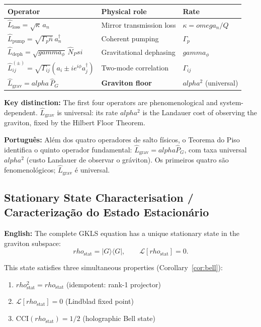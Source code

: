 \documentclass[12pt,a4paper]{article}
\def\Psi{Psi}%
\def\alpha{alpha}%
\def\gamma{gamma}%
\def\rho{rho}%
\def\omega{omega}%
\begin{document}
\begin{center}
\renewcommand{\arraystretch}{1.3}
\begin{tabular}{lll}
\toprule
Operator & Physical role & Rate \\
\midrule
$\hat{L}_{\mathrm{loss}} = \sqrt{\kappa}\,a_n$                             & Mirror transmission loss    & $\kappa = \omega_n/Q$ \\
$\hat{L}_{\mathrm{pump}} = \sqrt{\Gamma_p\bar{n}}\,a_n^\dagger$            & Coherent pumping            & $\Gamma_p$ \\
$\hat{L}_{\mathrm{deph}} = \sqrt{\gamma_\phi}\,\hat{N}_\Psi$               & Gravitational dephasing     & $\gamma_\phi$ \\
$\hat{L}_{ij}^{(\pm)} = \sqrt{\Gamma_{ij}}(a_i \pm ie^{i\phi}a_j^\dagger)$ & Two-mode correlation        & $\Gamma_{ij}$ \\
$\hat{L}_{\mathrm{grav}} = \alpha\,\hat{P}_G$                              & \textbf{Graviton floor}     & $\alpha^2$ (universal) \\
\bottomrule
\end{tabular}
\end{center}

\textbf{Key distinction:} The first four operators are phenomenological and system-dependent. $\hat{L}_{\mathrm{grav}}$ is universal: its rate $\alpha^2$ is the Landauer cost of observing the graviton, fixed by the Hilbert Floor Theorem.

\textbf{Português:} Além dos quatro operadores de salto físicos, o Teorema do Piso identifica o quinto operador fundamental: $\hat{L}_{\text{grav}} = \alpha\hat{P}_G$, com taxa universal $\alpha^2$ (custo Landauer de observar o gráviton). Os primeiros quatro são fenomenológicos; $\hat{L}_{\text{grav}}$ é universal.

\subsection{Stationary State Characterisation / Caracterização do Estado Estacionário}

\textbf{English:} The complete GKLS equation has a unique stationary state in the graviton subspace:
\begin{equation}
\rho_{\mathrm{stat}} = |G\rangle\langle G|, \qquad \mathcal{L}[\rho_{\mathrm{stat}}] = 0.
\end{equation}

This state satisfies three simultaneous properties (Corollary~\ref{cor:bell}):
\begin{enumerate}
    \item $\rho_{\mathrm{stat}}^2 = \rho_{\mathrm{stat}}$ (idempotent: rank-1 projector)
    \item $\mathcal{L}[\rho_{\mathrm{stat}}] = 0$ (Lindblad fixed point)
    \item $\mathrm{CCI}(\rho_{\mathrm{stat}}) = 1/2$ (holographic Bell state)
\end{enumerate}
\end{document}
